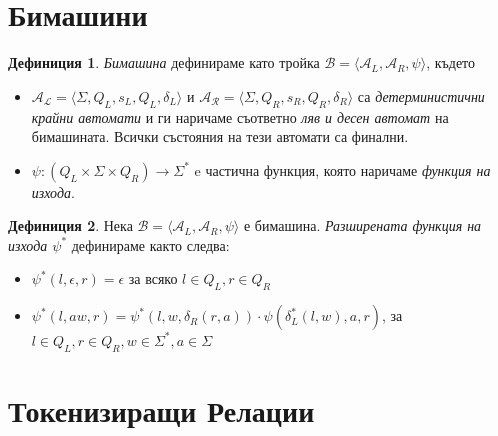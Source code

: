 \documentclass[11pt, oneside]{article}   	%
\theoremstyle{definition}
\newtheorem{definition}{Дефиниция}[section]
\begin{document}
\section{Бимашини}

\begin{definition}
	 \emph{Бимашина} дефинираме като тройка \( \mathcal{B} = \langle \mathcal{A}_L, \mathcal{A}_R, \psi \rangle \), където

	\begin{itemize}
		\item \( \mathcal{A_L} = \langle \Sigma, Q_L, s_L, Q_L, \delta_L \rangle \) и \( \mathcal{A_R} = \langle \Sigma, Q_R, s_R, Q_R, \delta_R \rangle \) са \emph{детерминистични крайни автомати} и ги наричаме съответно \emph{ляв и десен автомат} на бимашината. Всички състояния на тези автомати са финални.
		\item \( \psi:(Q_L \times \Sigma \times Q_R) \to \Sigma^* \) e частична функция, която наричаме \emph{функция на изхода}.
	\end{itemize}
\end{definition}

\begin{definition}
	Нека \( \mathcal{B} = \langle \mathcal{A}_L, \mathcal{A}_R, \psi \rangle \) е бимашина. \emph{Разширената функция на изхода \( \psi^* \)} дефинираме както следва:

	\begin{itemize}
		\item \( \psi^*(l, \epsilon, r) = \epsilon \) за всяко \( l \in Q_L, r \in Q_R \)
		\item \( \psi^*(l, aw, r) = \psi^*(l, w, \delta_R(r, a)) \cdot \psi(\delta^*_L(l, w), a, r) \), за \( l \in Q_L, r \in Q_R, w \in \Sigma^*, a \in \Sigma \)
	\end{itemize}
\end{definition}

\section{Токенизиращи Релации}

\end{document}
